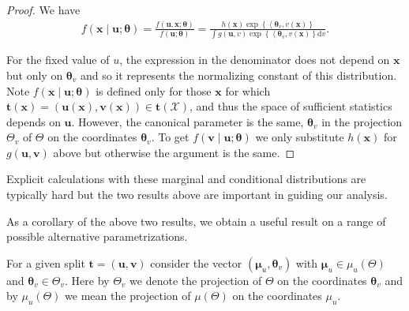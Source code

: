 \begin{proof}
    We have
\begin{align*}
f(\mathbf{x} \mid \boldsymbol{u} ; \boldsymbol{\theta})=\frac{f(\boldsymbol{u}, \mathbf{x} ; \boldsymbol{\theta})}{f(\boldsymbol{u} ; \boldsymbol{\theta})}=\frac{h(\mathbf{x}) \exp \left\{\left\langle\boldsymbol{\theta}_v, v(\mathbf{x})\right\}\right.}{\int g(\boldsymbol{u}, v) \exp \left\{\left\langle\boldsymbol{\theta}_v, v(\mathbf{x})\right\} \mathrm{d} v\right.} .
\end{align*}

For the fixed value of $u$, the expression in the denominator does not depend on $\mathbf{x}$ but only on $\boldsymbol{\theta}_v$ and so it represents the normalizing constant of this distribution. Note $f(\mathbf{x} \mid \boldsymbol{u} ; \boldsymbol{\theta})$ is defined only for those $\mathbf{x}$ for which $\mathbf{t}(\mathbf{x})=(\boldsymbol{u}(\mathbf{x}), \boldsymbol{v}(\mathbf{x})) \in \mathbf{t}(\mathcal{X})$, and thus the space of sufficient statistics depends on $\boldsymbol{u}$. However, the canonical parameter is the same, $\boldsymbol{\theta}_v$ in the projection $\Theta_v$ of $\Theta$ on the coordinates $\boldsymbol{\theta}_v$. To get $f(\boldsymbol{v} \mid \boldsymbol{u} ; \boldsymbol{\theta})$ we only substitute $h(\mathbf{x})$ for $g(\boldsymbol{u}, \boldsymbol{v})$ above but otherwise the argument is the same.
\end{proof}

\begin{remark}
    Explicit calculations with these marginal and conditional distributions are typically hard but the two results above are important in guiding our analysis.
\end{remark}

As a corollary of the above two results, we obtain a useful result on a range of possible alternative parametrizations. 

For a given split $\mathbf{t}=(\boldsymbol{u}, \boldsymbol{v})$ consider the vector $(\boldsymbol{\mu}_u, \boldsymbol{\theta}_v)$ with $\boldsymbol{\mu}_u \in \mu_u(\Theta)$ and $\boldsymbol{\theta}_v \in \Theta_v$. Here by $\Theta_v$ we denote the projection of $\Theta$ on the coordinates $\boldsymbol{\theta}_v$ and by $\mu_u(\Theta)$ we mean the projection of $\mu(\Theta)$ on the coordinates $\mu_u$.

